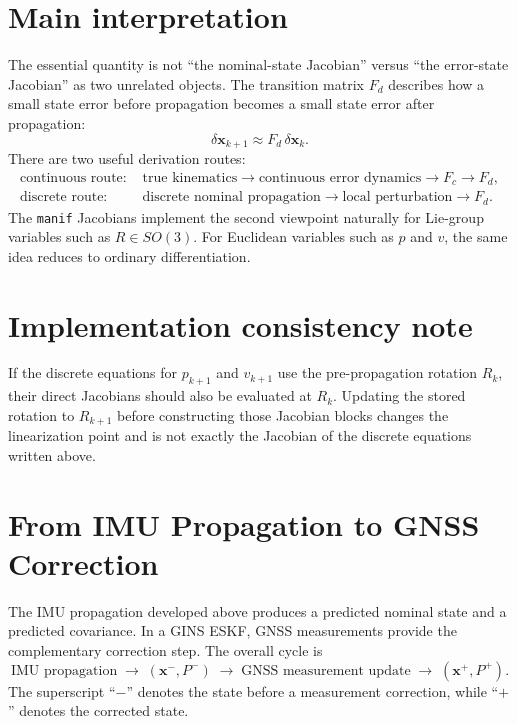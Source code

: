 \documentclass[11pt]{article}
\begin{document}
\section{Main interpretation}
The essential quantity is not ``the nominal-state Jacobian'' versus ``the error-state Jacobian'' as two unrelated objects. The transition matrix $F_d$ describes how a small state error before propagation becomes a small state error after propagation:
\begin{equation}
\boxed{\delta\bm x_{k+1}\approx F_d\,\delta\bm x_k.}
\end{equation}
There are two useful derivation routes:
\begin{align*}
\text{continuous route: }&
\text{true kinematics}
\rightarrow \text{continuous error dynamics}
\rightarrow F_c
\rightarrow F_d,\\
\text{discrete route: }&
\text{discrete nominal propagation}
\rightarrow \text{local perturbation}
\rightarrow F_d.
\end{align*}
The \texttt{manif} Jacobians implement the second viewpoint naturally for Lie-group variables such as $R\in SO(3)$. For Euclidean variables such as $p$ and $v$, the same idea reduces to ordinary differentiation.

\section{Implementation consistency note}
If the discrete equations for $p_{k+1}$ and $v_{k+1}$ use the pre-propagation rotation $R_k$, their direct Jacobians should also be evaluated at $R_k$. Updating the stored rotation to $R_{k+1}$ before constructing those Jacobian blocks changes the linearization point and is not exactly the Jacobian of the discrete equations written above.



\section{From IMU Propagation to GNSS Correction}
The IMU propagation developed above produces a predicted nominal state and a predicted covariance. In a GINS ESKF, GNSS measurements provide the complementary correction step. The overall cycle is
\begin{equation}
\boxed{
\text{IMU propagation}
\;\longrightarrow\;
(\bm x^{-},P^{-})
\;\longrightarrow\;
\text{GNSS measurement update}
\;\longrightarrow\;
(\bm x^{+},P^{+}).
}
\end{equation}
The superscript ``$-$'' denotes the state before a measurement correction, while ``$+$'' denotes the corrected state.
\end{document}
